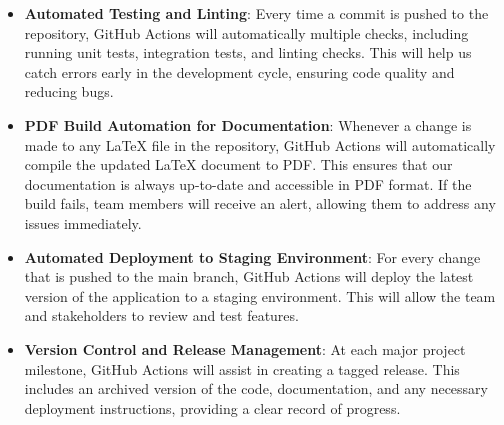 \documentclass{article}
\begin{document}
\begin{itemize}
    \item \textbf{Automated Testing and Linting}: Every time a commit is pushed to the repository, GitHub Actions will automatically multiple checks, including running unit tests, integration tests, and linting checks. This will help us catch errors early in the development cycle, ensuring code quality and reducing bugs.

    \item \textbf{PDF Build Automation for Documentation}: Whenever a change is made to any LaTeX file in the repository, GitHub Actions will automatically compile the updated LaTeX document to PDF. This ensures that our documentation is always up-to-date and accessible in PDF format. If the build fails, team members will receive an alert, allowing them to address any issues immediately.

    \item \textbf{Automated Deployment to Staging Environment}: For every change that is pushed to the main branch, GitHub Actions will deploy the latest version of the application to a staging environment. This will allow the team and stakeholders to review and test features. 

    \item \textbf{Version Control and Release Management}: At each major project milestone, GitHub Actions will assist in creating a tagged release. This includes an archived version of the code, documentation, and any necessary deployment instructions, providing a clear record of progress.

\end{itemize}
\end{document}
